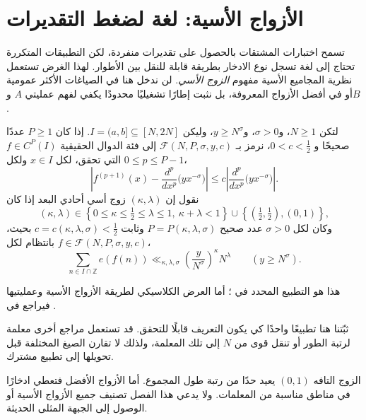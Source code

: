 \section{الأزواج الأسية: لغة لضغط التقديرات}

تسمح اختبارات المشتقات بالحصول على تقديرات منفردة، لكن التطبيقات المتكررة تحتاج إلى لغة تسجل نوع الادخار بطريقة قابلة للنقل بين الأطوار. لهذا الغرض تستعمل نظرية المجاميع الأسية مفهوم \emph{الزوج الأسي}. لن ندخل هنا في الصياغات الأكثر عمومية أو في أفضل الأزواج المعروفة، بل نثبت إطارًا تشغيليًا محدودًا يكفي لفهم عمليتي \(A\) و\(B\).

\begin{definition}
\label{def:exponent-pair-framework}
لتكن \(N\ge1\)، و\(\sigma>0\)، و\(y\ge N^\sigma\)، وليكن
\(I=(a,b]\subseteq[N,2N]\). إذا كان \(P\ge1\) عددًا صحيحًا و
\(0<c<\tfrac12\)، نرمز بـ
\(\mathcal F(N,P,\sigma,y,c)\) إلى فئة الدوال الحقيقية
\(f\in C^P(I)\) التي تحقق، لكل \(x\in I\) ولكل
\(0\le p\le P-1\)،
\[
\left|
 f^{(p+1)}(x)
 -\frac{d^p}{dx^p}\bigl(yx^{-\sigma}\bigr)
\right|
\le
c\left|
 \frac{d^p}{dx^p}\bigl(yx^{-\sigma}\bigr)
\right|.
\]
نقول إن \((\kappa,\lambda)\) زوج أسي أحادي البعد إذا كان
\[
(\kappa,\lambda)\in
\left\{0\le\kappa\le\tfrac12\le\lambda\le1,\ 
\kappa+\lambda<1\right\}
\cup
\left\{\left(\tfrac12,\tfrac12\right),(0,1)\right\},
\]
وكان لكل \(\sigma>0\) عدد صحيح
\(P=P(\kappa,\lambda,\sigma)\) وثابت
\(c=c(\kappa,\lambda,\sigma)<\tfrac12\) بحيث، بانتظام لكل
\(f\in\mathcal F(N,P,\sigma,y,c)\)،
\[
\sum_{n\in I\cap\mathbb Z} e(f(n))
\ll_{\kappa,\lambda,\sigma}
\left(\frac{y}{N^\sigma}\right)^\kappa N^\lambda
\qquad(y\ge N^\sigma).
\]
\end{definition}

هذا هو التطبيع المحدد في \cite[المعادلتان~(1.1)--(1.2)]{TrudgianYang2024}؛
أما العرض الكلاسيكي لطريقة الأزواج الأسية وعمليتيها فيراجع في
\cite[الفصل~3، الصفحات~21--37]{GrahamKolesnik1991}.

\begin{remark}
ثبّتنا هنا تطبيعًا واحدًا كي يكون التعريف قابلًا للتحقق. قد تستعمل مراجع أخرى
معلمة لرتبة الطور أو تنقل قوى من \(N\) إلى تلك المعلمة، ولذلك لا تقارن الصيغ
المختلفة قبل تحويلها إلى تطبيع مشترك.
\end{remark}

الزوج التافه \((0,1)\) يعيد حدًا من رتبة طول المجموع. أما الأزواج الأفضل فتعطي ادخارًا في مناطق مناسبة من المعلمات. ولا يدعي هذا الفصل تصنيف جميع الأزواج الأسية أو الوصول إلى الجبهة المثلى الحديثة.

